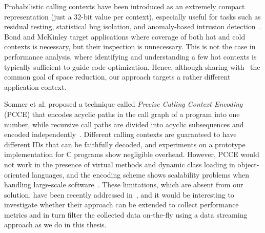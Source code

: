 Probabilistic calling contexts have been introduced as an extremely compact representation (just a 32-bit value per context), especially useful for tasks such as residual testing, statistical bug isolation, and anomaly-based intrusion detection~\cite{Bond07}. Bond and McKinley target applications where coverage of both hot and cold contexts is necessary, but their inspection is unnecessary. This is not the case in performance analysis, where identifying and understanding a few hot contexts is typically sufficient to guide code optimization. Hence, although sharing with~\cite{Bond07} the common goal of space reduction, our approach targets a rather different application context.

Somner et al. proposed a technique called {\em Precise Calling Context Encoding} (PCCE) that encodes acyclic paths in the call graph of a program into one number, while recursive call paths are divided into acyclic subsequences and encoded independently~\cite{Sumner10,Sumner12}. Different calling contexts are guaranteed to have different IDs that can be faithfully decoded, and experiments on a prototype implementation for C programs show negligible overhead. However, PCCE would not work in the presence of virtual methods and dynamic class loading in object-oriented languages, and the encoding scheme shows scalability problems when handling large-scale software~\cite{Bond10,Zeng14}. These limitations, which are absent from our solution, have been recently addressed in~\cite{Zeng14}, and it would be interesting to investigate whether their approach can be extended to collect performance metrics and in turn filter the collected data on-the-fly using a data streaming approach as we do in this thesis.